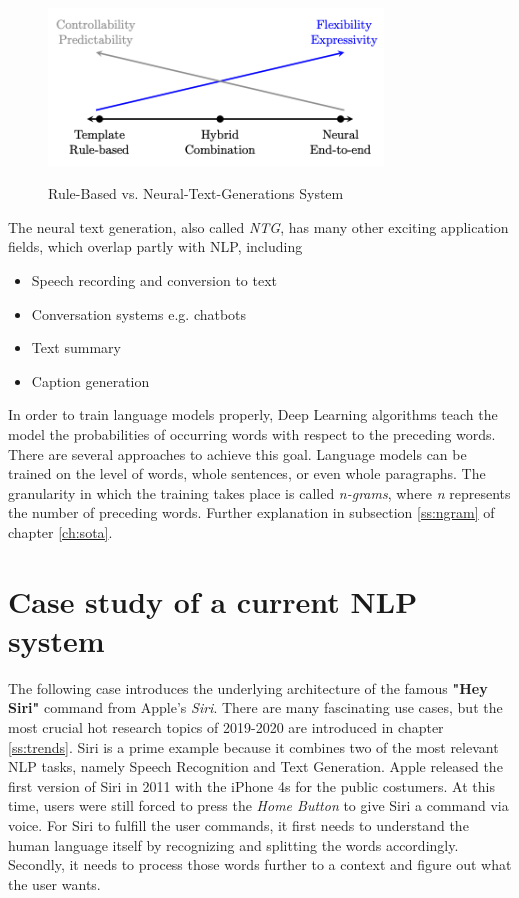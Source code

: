 \begin{figure}
  \begin{center}
  \includegraphics[width=3.5in]{photos/rule_based}\\
  \caption{Rule-Based vs. Neural-Text-Generations System \cite{NTG2}}\label{rules_based}
  \end{center}
\end{figure}

The neural text generation, also called \textit{NTG}, has many other exciting application fields, which overlap partly with NLP, including
\begin{itemize}
\item Speech recording and conversion to text
\item Conversation systems e.g. chatbots
\item Text summary
\item Caption generation
\end{itemize} 

In order to train language models properly, Deep Learning algorithms teach the model the probabilities of occurring words with respect to the preceding words. There are several approaches to achieve this goal. Language models can be trained on the level of words, whole sentences, or even whole paragraphs. The granularity in which the training takes place is called \textit{n-grams}, where \textit{n} represents the number of preceding words. Further explanation in subsection \ref{ss:ngram} of chapter \ref{ch:sota}.

\section{Case study of a current NLP system}

The following case introduces the underlying architecture of the famous \textbf{"Hey Siri"} command from Apple's \textit{Siri}. There are many fascinating use cases, but the most crucial hot research topics of 2019-2020 are introduced in chapter \ref{ss:trends}. Siri is a prime example because it combines two of the most relevant NLP tasks, namely Speech Recognition and Text Generation. Apple released the first version of Siri in 2011 with the iPhone 4s for the public costumers. At this time, users were still forced to press the \textit{Home Button} to give Siri a command via voice. For Siri to fulfill the user commands, it first needs to understand the human language itself by recognizing and splitting the words accordingly. Secondly, it needs to process those words further to a context and figure out what the user wants. 

